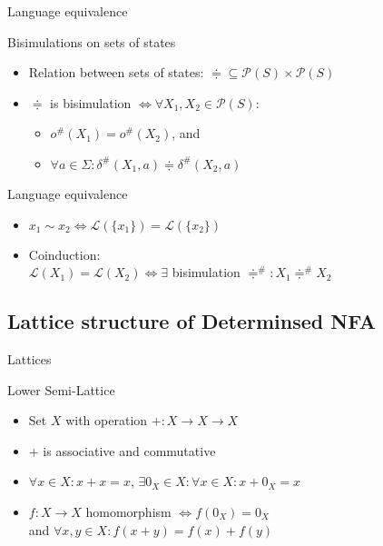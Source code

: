 \documentclass[compress]{beamer}
\begin{document}
\begin{frame}{Language equivalence}
  \begin{block}{Bisimulations on sets of states}
    \begin{itemize}
      \item Relation between sets of states: $\doteqdot \subseteq \mathcal{P}(S) \times \mathcal{P}(S)$
      \item $\doteqdot$ is bisimulation $\Leftrightarrow \forall X_1, X_2 \in \mathcal{P}(S): $
        \begin{itemize}
          \item $o^\#(X_1) = o^\#(X_2)$, and
          \item $\forall a \in \Sigma: \delta^\#(X_1, a) \doteqdot \delta^\#(X_2, a)$
        \end{itemize}
    \end{itemize}
  \end{block}

  \begin{block}{Language equivalence}
    \begin{itemize}
      \item $x_1 \sim x_2 \Leftrightarrow \mathcal{L}(\{x_1\}) = \mathcal{L}(\{x_2\})$
      \item Coinduction:\\
        $\mathcal{L}(X_1) = \mathcal{L}(X_2) \Leftrightarrow \exists$ bisimulation $\doteqdot^\#: X_1 \doteqdot^\# X_2$
    \end{itemize}
  \end{block}
\end{frame}

\subsection{Lattice structure of Determinsed NFA}

\begin{frame}{Lattices}
  \begin{block}{Lower Semi-Lattice}
    \begin{itemize}
      \item Set $X$ with operation $+: X \to X \to X$
      \item $+$ is associative and commutative
      \item $\forall x \in X: x + x = x$, $\exists 0_X \in X: \forall x \in X: x + 0_X = x$
      \item $f: X \to X$ homomorphism $\Leftrightarrow f(0_X) = 0_X $\\
            and $\forall x, y \in X: f(x+y) = f(x) + f(y)$
    \end{itemize}
  \end{block}
\end{frame}
\end{document}
